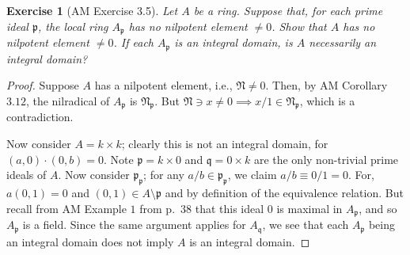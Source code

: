 \documentclass[12pt,letterpaper]{article}
\newtheorem{problem}{Exercise}[section]
\theoremstyle{definition}
\theoremstyle{remark}
\numberwithin{figure}{problem}
\numberwithin{equation}{section}
\begin{document}
\begin{problem}[AM Exercise 3.5]
  Let $A$ be a ring. Suppose that, for each prime ideal $\mathfrak{p}$, the local ring $A_\mathfrak{p}$ has no nilpotent element $\ne 0$. Show that $A$ has no nilpotent element $\ne 0$. If each $A_\mathfrak{p}$ is an integral domain, is $A$ necessarily an integral domain?
\end{problem}
\begin{proof}
  Suppose $A$ has a nilpotent element, i.e., $\mathfrak{N} \ne 0$. Then, by AM Corollary $3.12$, the nilradical of $A_\mathfrak{p}$ is $\mathfrak{N}_\mathfrak{p}$. But $\mathfrak{N} \ni x \ne 0 \implies x/1 \in \mathfrak{N}_\mathfrak{p}$, which is a contradiction.
  \par Now consider $A = k \times k$; clearly this is not an integral domain, for $(a,0)\cdot(0,b) = 0$. Note $\mathfrak{p} = k \times 0$ and $\mathfrak{q} = 0 \times k$ are the only non-trivial prime ideals of $A$. Now consider $\mathfrak{p}_\mathfrak{p}$; for any $a/b \in \mathfrak{p}_\mathfrak{p}$, we claim $a/b \equiv 0/1 = 0$. For, $a(0,1) = 0$ and $(0,1) \in A \setminus \mathfrak{p}$ and by definition of the equivalence relation. But recall from AM Example $1$ from p.~$38$ that this ideal $0$ is maximal in $A_\mathfrak{p}$, and so $A_\mathfrak{p}$ is a field. Since the same argument applies for $A_\mathfrak{q}$, we see that each $A_\mathfrak{p}$ being an integral domain does not imply $A$ is an integral domain.
\end{proof}
\end{document}
